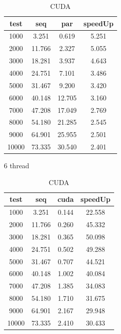 \documentclass[11pt]{article}
\begin{document}
    \begin{table}
        \begin{minipage}{0.49\textwidth}
            \begin{tabular}{|c|c|c|c|}
            \hline
            test & seq & par & speedUp\\
            \hline
            1000 & 3.251 & 0.619 & 5.251 \\
            2000 & 11.766 & 2.327 & 5.055 \\
            3000 & 18.281 & 3.937 & 4.643 \\
            4000 & 24.751 & 7.101 & 3.486 \\
            5000 & 31.467 & 9.200 & 3.420 \\
            6000 & 40.148 & 12.705 & 3.160 \\
            7000 & 47.208 & 17.049 & 2.769 \\
            8000 & 54.180 & 21.285 & 2.545 \\
            9000 & 64.901 & 25.955 & 2.501 \\
            10000 & 73.335 & 30.540 & 2.401 \\
            \hline
            \end{tabular}
            \caption{6 thread}
        \end{minipage}
        \hfill
        \begin{minipage}{0.49\textwidth}
            \begin{tabular}{|c|c|c|c|}
                \hline
                test & seq & cuda & speedUp\\
                \hline
                1000 & 3.251 & 0.144 & 22.558 \\
                2000 & 11.766 & 0.260 & 45.332 \\
                3000 & 18.281 & 0.365 & 50.098 \\
                4000 & 24.751 & 0.502 & 49.288 \\
                5000 & 31.467 & 0.707 & 44.521 \\
                6000 & 40.148 & 1.002 & 40.084 \\
                7000 & 47.208 & 1.385 & 34.083 \\
                8000 & 54.180 & 1.710 & 31.675 \\
                9000 & 64.901 & 2.167 & 29.948 \\
                10000 & 73.335 & 2.410 & 30.433 \\
                \hline
            \end{tabular}
            \caption{CUDA}
        \end{minipage}
    \end{table}
\end{document}
